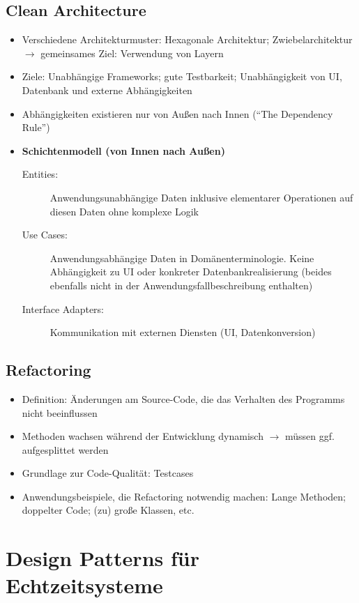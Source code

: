\subsection{Clean Architecture}
\begin{itemize}
	\item Verschiedene Architekturmuster: Hexagonale Architektur; Zwiebelarchitektur \(\rightarrow\) gemeinsames Ziel: Verwendung von Layern
	\item Ziele: Unabhängige Frameworks; gute Testbarkeit; Unabhängigkeit von UI, Datenbank und externe Abhängigkeiten
	\item Abhängigkeiten existieren nur von Außen nach Innen ("`The Dependency Rule"')
	\item \textbf{Schichtenmodell (von Innen nach Außen)}
	\begin{description}
		\item[Entities:] Anwendungsunabhängige Daten inklusive elementarer Operationen auf diesen Daten ohne komplexe Logik
		\item[Use Cases:] Anwendungsabhängige Daten in Domänenterminologie. Keine Abhängigkeit zu UI oder konkreter Datenbankrealisierung (beides ebenfalls nicht in der Anwendungsfallbeschreibung enthalten)
		\item[Interface Adapters:] Kommunikation mit externen Diensten (UI, Datenkonversion)
	\end{description}
\end{itemize}


\subsection{Refactoring}
\begin{itemize}
	\item Definition: Änderungen am Source-Code, die das Verhalten des Programms nicht beeinflussen
	\item Methoden wachsen während der Entwicklung dynamisch \(\rightarrow\) müssen ggf. aufgesplittet werden
	\item Grundlage zur Code-Qualität: Testcases
	\item Anwendungsbeispiele, die Refactoring notwendig machen: Lange Methoden; doppelter Code; (zu) große Klassen, etc.
\end{itemize}



\section{Design Patterns für Echtzeitsysteme}

